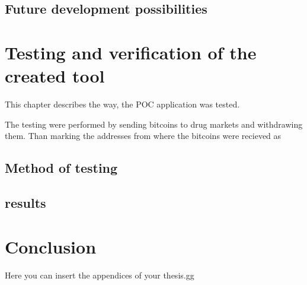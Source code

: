 \documentclass[
  digital, %
  table,   %
  lof,     %
  lot,     %
  oneside
]{fithesis3}
\begin{document}
\section{Future development possibilities}


\chapter{Testing and verification of the created tool}
This chapter describes the way, the POC application was tested.

The testing were performed by sending bitcoins to drug markets and withdrawing them.
Than marking the addresses from where the bitcoins were recieved as 

\section{Method of testing}
\section{results}



\chapter{Conclusion}

Here you can insert the appendices of your thesis.gg
\end{document}
